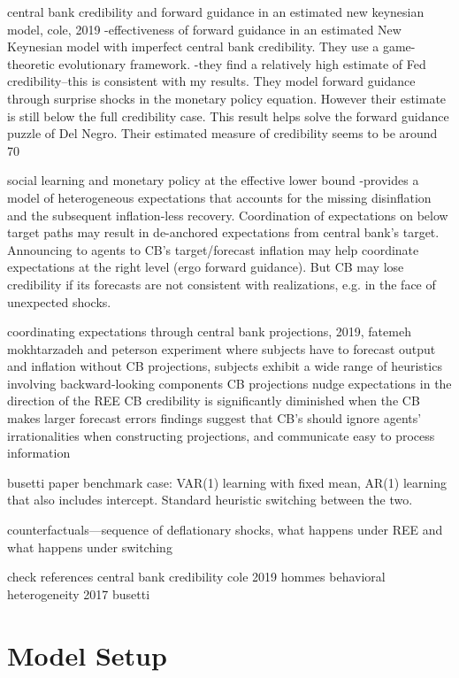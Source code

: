 \documentclass[12pt]{article}
\numberwithin{equation}{section}
\begin{document}
central bank credibility and forward guidance in an estimated new keynesian model, cole, 2019
-effectiveness of forward guidance in an estimated New Keynesian model with imperfect central bank credibility. They use a game-theoretic evolutionary framework. 
-they find a relatively high estimate of Fed credibility--this is consistent with my results. They model forward guidance through surprise shocks in the monetary policy equation. However their estimate is still below the full credibility case. This result helps solve the forward guidance puzzle of Del Negro. 
Their estimated measure of credibility seems to be around 70%


social learning and monetary policy at the effective lower bound
-provides a model of heterogeneous expectations that accounts for the missing disinflation and the subsequent inflation-less recovery. Coordination of expectations on below target paths may result in de-anchored expectations from central bank's target. Announcing to agents to CB's target/forecast inflation may help coordinate expectations at the right level (ergo forward guidance). But CB may lose credibility if its forecasts are not consistent with realizations, e.g. in the face of unexpected shocks. 

coordinating expectations through central bank projections, 2019, fatemeh mokhtarzadeh and peterson
experiment where subjects have to forecast output and inflation
without CB projections, subjects exhibit a wide range of heuristics involving backward-looking components
CB projections nudge expectations in the direction of the REE 
CB credibility is significantly diminished when the CB makes larger forecast errors
findings suggest that CB's should ignore agents' irrationalities when constructing projections, and communicate easy to process information

busetti paper
benchmark case: VAR(1) learning with fixed mean, AR(1) learning that also includes intercept. Standard heuristic switching between the two. 

counterfactuals---sequence of deflationary shocks, what happens under REE and what happens under switching





check references
central bank credibility cole 2019
hommes behavioral heterogeneity 2017
busetti



\section{Model Setup}
\end{document}
